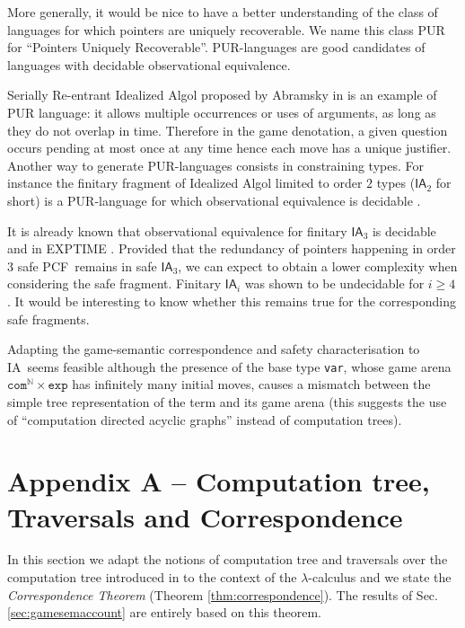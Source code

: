 \documentclass{llncs}
\newcommand\nat{\mathbb{N}}
\newcommand\ialgol{\textsf{IA}}
\newcommand\iacom{\texttt{com}}
\newcommand\iaexp{\texttt{exp}}
\newcommand\iavar{\texttt{var}}
\newcommand\pcf{\textsf{PCF}}
\begin{document}
More generally, it would be nice to have a better understanding of the class of languages for which pointers are uniquely recoverable. We name this class PUR for ``Pointers Uniquely Recoverable''. PUR-languages are good candidates of languages with decidable observational equivalence.

Serially Re-entrant Idealized Algol proposed by Abramsky  in \cite{abramsky:mchecking_ia} is an example of PUR language: it allows multiple occurrences or uses of arguments, as long as they do not overlap in time. Therefore in the game denotation, a given question occurs pending at most once at any time hence each move has a unique justifier. Another way to generate PUR-languages consists in constraining types. For instance the finitary fragment of Idealized Algol \cite{Reynolds81}  limited to order $2$ types ($\ialgol_2$ for short) is a PUR-language for which observational equivalence is decidable \cite{ghicamccusker00}.


It is already known that observational equivalence for finitary $\ialgol_3$ is decidable and in EXPTIME \cite{DBLP:conf/fossacs/MurawskiW05}. 
Provided that the redundancy of pointers happening in order $3$ safe \pcf\ remains in safe $\ialgol_3$, we can expect to obtain a lower complexity when considering the safe fragment.
Finitary $\ialgol_i$ was shown to be undecidable for $i\geq4$ \cite{murawski03program}.
It would be interesting to know whether this remains true for the corresponding safe fragments.

Adapting the game-semantic correspondence and safety characterisation to \ialgol\ seems feasible although the presence of the base type \iavar, whose game arena $\iacom^{\nat} \times \iaexp$ has infinitely many initial moves, causes a mismatch between the simple tree representation of the term and its game arena (this suggests the use of ``computation directed acyclic graphs'' instead of computation trees). 





\section*{Appendix A -- Computation tree, Traversals and Correspondence}
\label{sec:correspondence}

In this section we adapt the notions of computation tree and
traversals over the computation tree introduced in \cite{OngLics2006} to the context of the $\lambda$-calculus
and we state the \emph{Correspondence Theorem} (Theorem \ref{thm:correspondence}).
The results of Sec. \ref{sec:gamesemaccount} are entirely based on this theorem.
\end{document}
